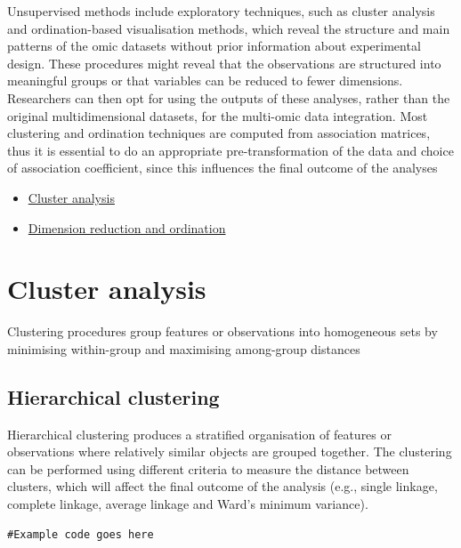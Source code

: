 \documentclass[
]{book}
\providecommand{\tightlist}{%
  \setlength{\itemsep}{0pt}\setlength{\parskip}{0pt}}
\begin{document}
Unsupervised methods include exploratory techniques, such as cluster analysis and ordination-based visualisation methods, which reveal the structure and main patterns of the omic datasets without prior information about experimental design. These procedures might reveal that the observations are structured into meaningful groups or that variables can be reduced to fewer dimensions. Researchers can then opt for using the outputs of these analyses, rather than the original multidimensional datasets, for the multi-omic data integration. Most clustering and ordination techniques are computed from association matrices, thus it is essential to do an appropriate pre-transformation of the data and choice of association coefficient, since this influences the final outcome of the analyses

\begin{itemize}
\tightlist
\item
  \protect\hyperlink{cluster-analysis}{Cluster analysis}
\item
  \protect\hyperlink{dimension-reduction-ordination}{Dimension reduction and ordination}
\end{itemize}

\hypertarget{cluster-analysis}{%
\section{Cluster analysis}\label{cluster-analysis}}

Clustering procedures group features or observations into homogeneous sets by minimising within-group and maximising among-group distances

\hypertarget{hierarchical-clustering}{%
\subsection{Hierarchical clustering}\label{hierarchical-clustering}}

Hierarchical clustering produces a stratified organisation of features or observations where relatively similar objects are grouped together. The clustering can be performed using different criteria to measure the distance between clusters, which will affect the final outcome of the analysis (e.g., single linkage, complete linkage, average linkage and Ward's minimum variance).

\begin{verbatim}
#Example code goes here
\end{verbatim}
\end{document}
